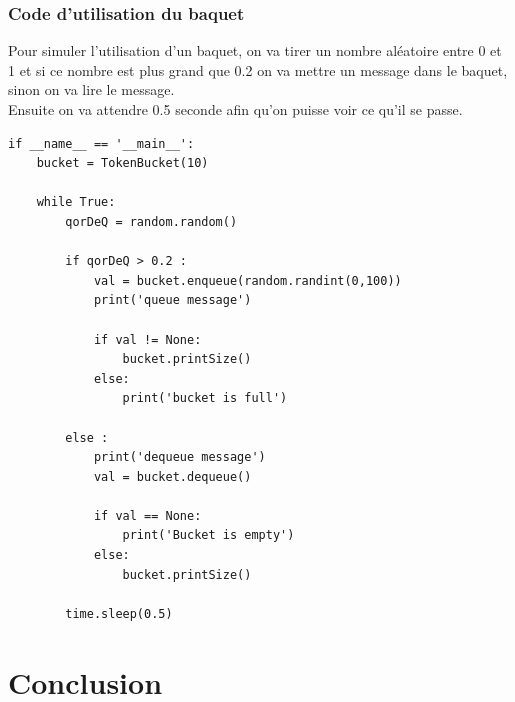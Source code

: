 \documentclass{article}
\begin{document}
\subsubsection{Code d'utilisation du baquet}

Pour simuler l'utilisation d'un baquet, on va tirer un nombre aléatoire entre 0 et 1 et si ce nombre est plus grand que 0.2 on va mettre un message dans le baquet, sinon on va lire le message.\\

Ensuite on va attendre 0.5 seconde afin qu'on puisse voir ce qu'il se passe.

\begin{lstlisting}
if __name__ == '__main__':
	bucket = TokenBucket(10)
	
	while True:
		qorDeQ = random.random()
		
		if qorDeQ > 0.2 :
			val = bucket.enqueue(random.randint(0,100))
			print('queue message')
			
			if val != None:
				bucket.printSize()
			else:
				print('bucket is full')
		
		else :
			print('dequeue message')
			val = bucket.dequeue()
		
			if val == None:
				print('Bucket is empty')
			else:
				bucket.printSize()
	
		time.sleep(0.5)
\end{lstlisting}

\section{Conclusion}
\end{document}
